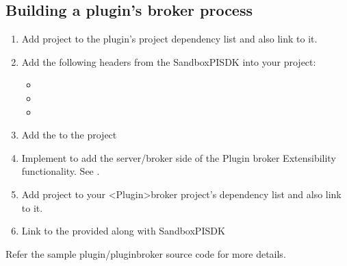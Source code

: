 \documentclass[letterpaper,12pt,english,openany,oneside]{sphinxmanual}
\begin{document}
\subsection{Building a plugin’s broker process}
\label{\detokenize{SandboxBrokerExt:building-a-plugin-s-broker-process}}\begin{enumerate}
%
\item {} 
Add  project to the plug\sphinxhyphen{}in’s project dependency list and also link to it.

\item {} 
Add the following headers from the SandboxPISDK into your project:
\begin{itemize}
\item {} 

\item {} 

\item {} 

\end{itemize}

\item {} 
Add the  to the project

\item {} 
Implement  to add the server/broker side of the Plugin broker Extensibility functionality. See .

\item {} 
Add  project to your <Plugin>broker project’s dependency list and also link to it.

\item {} 
Link to the  provided along with SandboxPISDK

\end{enumerate}

Refer the sample plugin/pluginbroker source code for more details.
\end{document}
